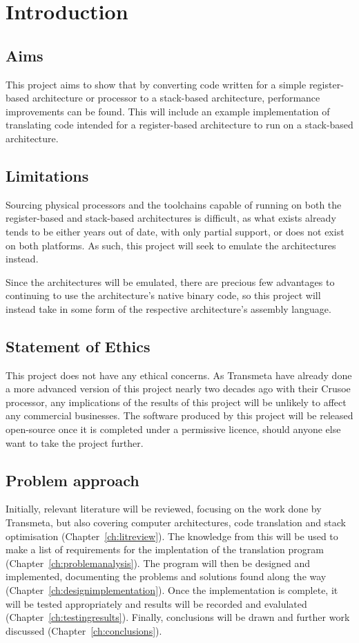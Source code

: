\chapter{Introduction}\label{ch:introduction}
\section{Aims}
This project aims to show that by converting code written for a simple
register-based architecture or processor to a stack-based architecture,
performance improvements can be found. This will include an example
implementation of translating code intended for a register-based architecture to
run on a stack-based architecture.

\section{Limitations}
Sourcing physical processors and the toolchains capable of running on both the
register-based and stack-based architectures is difficult, as what exists
already tends to be either years out of date, with only partial support, or does
not exist on both platforms. As such, this project will seek to emulate the
architectures instead.

Since the architectures will be emulated, there are precious few advantages to
continuing to use the architecture's native binary code, so this project will
instead take in some form of the respective architecture's assembly language.

\section{Statement of Ethics}
This project does not have any ethical concerns. As Transmeta have already done
a more advanced version of this project nearly two decades ago with their Crusoe
processor, any implications of the results of this project will be unlikely to
affect any commercial businesses. The software produced by this project will be
released open-source once it is completed under a permissive licence, should
anyone else want to take the project further.

\section{Problem approach}
Initially, relevant literature will be reviewed, focusing on the work done by
Transmeta, but also covering computer architectures, code translation and stack
optimisation (Chapter~\ref{ch:litreview}). The knowledge from this will be used
to make a list of requirements for the implentation of the translation program
(Chapter~\ref{ch:problemanalysis}). The program will then be designed and
implemented, documenting the problems and solutions found along the way
(Chapter~\ref{ch:designimplementation}). Once the implementation is complete, it
will be tested appropriately and results will be recorded and evalulated
(Chapter~\ref{ch:testingresults}). Finally, conclusions will be drawn and
further work discussed (Chapter~\ref{ch:conclusions}).

